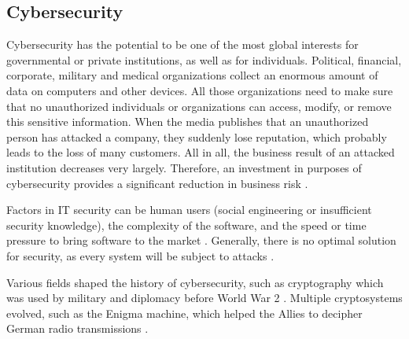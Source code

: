\subsection{Cybersecurity}
\label{subsec:02_cybersecurity}

Cybersecurity has the potential to be one of the most global interests for governmental or private institutions, as well as for individuals. Political, financial, corporate, military and medical organizations collect an enormous amount of data on computers and other devices. All those organizations need to make sure that no unauthorized individuals or organizations can access, modify, or remove this sensitive information. When the media publishes that an unauthorized person has attacked a company, they suddenly lose reputation, which probably leads to the loss of many customers. All in all, the business result of an attacked institution decreases very largely. Therefore, an investment in purposes of cybersecurity provides a significant reduction in business risk \cite{Bishop2003}.

Factors in IT security can be human users (social engineering or insufficient security knowledge), the complexity of the software, and the speed or time pressure to bring software to the market \cite{Bishop2003}. Generally, there is no optimal solution for security, as every system will be subject to attacks \cite{Bishop2003}.

Various fields shaped the history of cybersecurity, such as cryptography which was used by military and diplomacy before World War 2 \cite{Bishop2003}. Multiple cryptosystems evolved, such as the Enigma machine, which helped the Allies to decipher German radio transmissions \cite{Kahn1991}.


